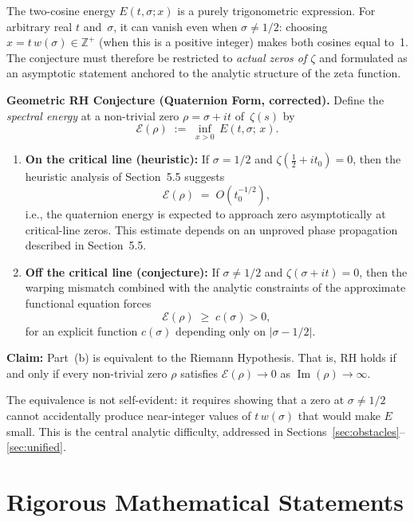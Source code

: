 \documentclass[12pt,a4paper]{article}
\newcommand{\ZZ}{\mathbb{Z}}
\begin{document}
The two-cosine energy $E(t,\sigma;x)$ is a purely trigonometric expression. For arbitrary real $t$ and~$\sigma$, it can vanish even when $\sigma \neq 1/2$: choosing $x = t\,w(\sigma) \in \ZZ^+$ (when this is a positive integer) makes both cosines equal to~1. The conjecture must therefore be restricted to \emph{actual zeros of $\zeta$} and formulated as an asymptotic statement anchored to the analytic structure of the zeta function.

\begin{definitionbox}
\textbf{Geometric RH Conjecture (Quaternion Form, corrected).}
Define the \emph{spectral energy} at a non-trivial zero $\rho = \sigma + it$ of~$\zeta(s)$ by
\[
\mathcal{E}(\rho) \;:=\; \inf_{x > 0}\, E(t,\sigma;\,x).
\]
\begin{enumerate}[label=(\alph*)]
\item \textbf{On the critical line (heuristic):} If $\sigma = 1/2$ and $\zeta(\tfrac12+it_0) = 0$, then the heuristic analysis of Section~5.5 suggests
\[
\mathcal{E}(\rho) \;=\; O(t_0^{-1/2}),
\]
i.e., the quaternion energy is expected to approach zero asymptotically at critical-line zeros. This estimate depends on an unproved phase propagation described in Section~5.5.
\item \textbf{Off the critical line (conjecture):} If $\sigma \neq 1/2$ and $\zeta(\sigma+it)=0$, then the warping mismatch combined with the analytic constraints of the approximate functional equation forces
\[
\mathcal{E}(\rho) \;\ge\; c(\sigma) > 0,
\]
for an explicit function $c(\sigma)$ depending only on $|\sigma - 1/2|$.
\end{enumerate}
\textbf{Claim:} Part~(b) is equivalent to the Riemann Hypothesis. That is, RH holds if and only if every non-trivial zero $\rho$ satisfies $\mathcal{E}(\rho) \to 0$ as $\operatorname{Im}(\rho) \to \infty$.
\end{definitionbox}

\noindent The equivalence is not self-evident: it requires showing that a zero at $\sigma \neq 1/2$ cannot accidentally produce near-integer values of $t\,w(\sigma)$ that would make $E$ small. This is the central analytic difficulty, addressed in Sections~\ref{sec:obstacles}--\ref{sec:unified}.

\section{Rigorous Mathematical Statements}
\label{sec:rigorous}
\end{document}
